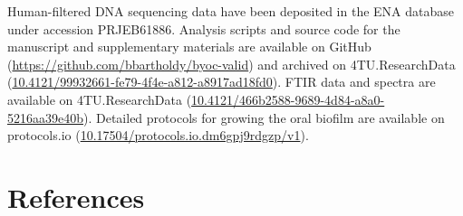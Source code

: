 \documentclass[
]{article}
\begin{document}
Human-filtered DNA sequencing data have been deposited in the ENA
database under accession PRJEB61886. Analysis scripts and source code
for the manuscript and supplementary materials are available on GitHub
(\url{https://github.com/bbartholdy/byoc-valid}) and archived on
4TU.ResearchData
(\href{https://doi.org/10.4121/99932661-fe79-4f4e-a812-a8917ad18fd0}{10.4121/99932661-fe79-4f4e-a812-a8917ad18fd0}).
FTIR data and spectra are available on 4TU.ResearchData
(\href{https://doi.org/10.4121/466b2588-9689-4d84-a8a0-5216aa39e40b}{10.4121/466b2588-9689-4d84-a8a0-5216aa39e40b}).
Detailed protocols for growing the oral biofilm are available on
protocols.io
(\href{https://dx.doi.org/10.17504/protocols.io.dm6gpj9rdgzp/v1}{10.17504/protocols.io.dm6gpj9rdgzp/v1}).

\hypertarget{references}{%
\section*{References}\label{references}}
\end{document}
